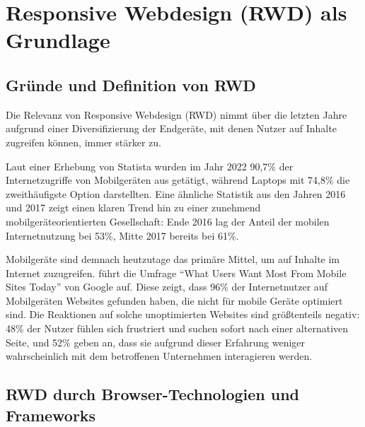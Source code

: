 \section{Responsive Webdesign (RWD) als Grundlage}

\subsection{Gründe und Definition von RWD}

Die Relevanz von Responsive Webdesign (RWD) nimmt über die letzten Jahre aufgrund einer Diversifizierung der Endgeräte, mit denen Nutzer auf Inhalte zugreifen können, immer stärker zu.

Laut einer Erhebung von Statista \autocite{statista.DataReportal.WeAreSocial.Hootsuite.2023} wurden im Jahr 2022 90,7\% der Internetzugriffe von Mobilgeräten aus getätigt, während Laptops mit 74,8\% die zweithäufigste Option darstellten.
Eine ähnliche Statistik aus den Jahren 2016 und 2017 \autocite{statista.GWI.2017} zeigt einen klaren Trend hin zu einer zunehmend mobilgeräteorientierten Gesellschaft: Ende 2016 lag der Anteil der mobilen Internetnutzung bei 53\%, Mitte 2017 bereits bei 61\%.

Mobilgeräte sind demnach heutzutage das primäre Mittel, um auf Inhalte im Internet zuzugreifen.
\autocite[S. 25]{Harmsen.2018} führt die Umfrage "`What Users Want Most From Mobile Sites Today"' von Google \autocite{Google.WhatUsersWantFromMobile.2012} auf.
Diese zeigt, dass 96\% der Internetnutzer auf Mobilgeräten Websites gefunden haben, die nicht für mobile Geräte optimiert sind.
Die Reaktionen auf solche unoptimierten Websites sind größtenteils negativ: 48\% der Nutzer fühlen sich frustriert und suchen sofort nach einer alternativen Seite, und 52\% geben an, dass sie aufgrund dieser Erfahrung weniger wahrscheinlich mit dem betroffenen Unternehmen interagieren werden.

\subsection{RWD durch Browser-Technologien und Frameworks}

